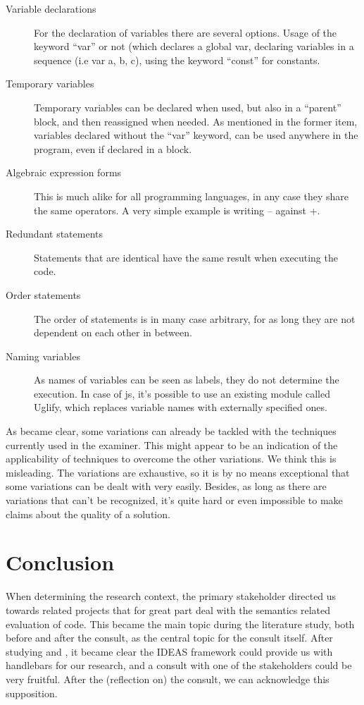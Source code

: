 \begin{description}
\begin{itemize}
  \end{itemize}
  \item[Variable declarations] For the declaration of variables there are 
  several options. Usage of the keyword ``var'' or not (which declares a global 
  var, declaring variables in a sequence (i.e var a, b, c), using the keyword 
  ``const'' for constants.
  \item[Temporary variables] Temporary variables can be declared when used, but
  also in a ``parent'' block, and then reassigned when needed. As mentioned in
  the former item, variables declared without the ``var'' keyword, can be used
  anywhere in the program, even if declared in a block.
  \item[Algebraic expression forms] This is much alike for all programming
  languages, in any case they share the same operators. A very simple example is
  writing -- against +.
  \item[Redundant statements] Statements that are identical have the same result
  when executing the code.  
  \item[Order statements] The order of statements is in many case arbitrary, for
  as long they are not dependent on each other in between.
  \item[Naming variables] As names of variables can be seen as labels, they do
  not determine the execution. In case of \gls{js}, it's possible to use an
  existing module called Uglify, which replaces variable names with externally
  specified ones.
\end{description}


As became clear, some variations can already be tackled with the techniques
currently used in the \gls{examiner}. This might appear to be an indication of 
the applicability of techniques to overcome the other variations. We think this 
is misleading. The variations are exhaustive, so it is by no means exceptional 
that some variations can be dealt with very easily. Besides, as long as there are
variations that can't be recognized, it's quite hard or even impossible to make
claims about the quality of a \gls{solution}. 

\section{Conclusion}
When determining the research context, the primary stakeholder directed us 
towards related projects that for great part deal with the semantics related
evaluation of \gls{code}. This became the main topic during the literature 
study, both before and after the consult, as the central topic for the consult
itself. After studying \citep{gerdes2012ask} and \citep{heeren2010specifying},
it became clear the IDEAS framework could provide us with handlebars for our
research, and a consult with one of the stakeholders could be very fruitful. 
After the (reflection on) the consult, we can acknowledge this supposition.


